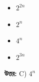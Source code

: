 \documentclass[12pt, a4paper]{article}
\begin{document}
\begin{itemize}[label={}, leftmargin=1cm, itemsep=0.5em]
    \item[\textbf{A)}] $2^{2n}$
    \item[\textbf{B)}] $2^{n}$
    \item[\textbf{C)}] $4^{n}$
    \item[\textbf{D)}] $2^{3n}$
\end{itemize}

\vspace{0.5em}
\begin{tcolorbox}[answerbox]
    \textbf{\color{success} উত্তর:} C) $4^{n}$
\end{tcolorbox}
\vspace{1em}
\end{document}
